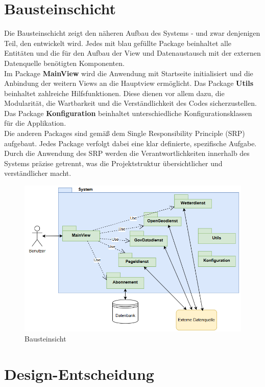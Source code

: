 \documentclass[a4paper,12pt]{scrreprt}
\begin{document}
\section*{\large \textbf{Bausteinschicht}}
Die Bausteinschicht zeigt den näheren Aufbau des Systems - und zwar denjenigen Teil, den entwickelt wird. Jedes mit blau gefüllte Package beinhaltet alle Entitäten und die für den Aufbau der View und Datenaustausch mit der externen Datenquelle benötigten Komponenten.\\
Im Package \textbf{MainView} wird die Anwendung mit Startseite initialisiert und die Anbindung der weitern Views an die Hauptview ermöglicht. Das Package \textbf{Utils} beinhaltet zahlreiche Hilfsfunktionen. Diese dienen vor allem dazu, die Modularität, die Wartbarkeit und die Verständlichkeit des Codes sicherzustellen. Das Package \textbf{Konfiguration} beinhaltet unterschiedliche Konfigurationsklassen für die Applikation.\\ Die anderen Packages sind gemäß dem Single Responsibility Principle (SRP) aufgebaut. Jedes Package verfolgt dabei eine klar definierte, spezifische Aufgabe. Durch die Anwendung des SRP werden die Verantwortlichkeiten innerhalb des Systems präzise getrennt, was die Projektstruktur übersichtlicher und verständlicher macht.
\begin{figure}[H]
	\centering
	\includegraphics[width=15cm]{Bausteinsicht-1.png}
	\caption{\label{} Bausteinsicht}
\end{figure}


\section{Design-Entscheidung}
	
\end{document}

